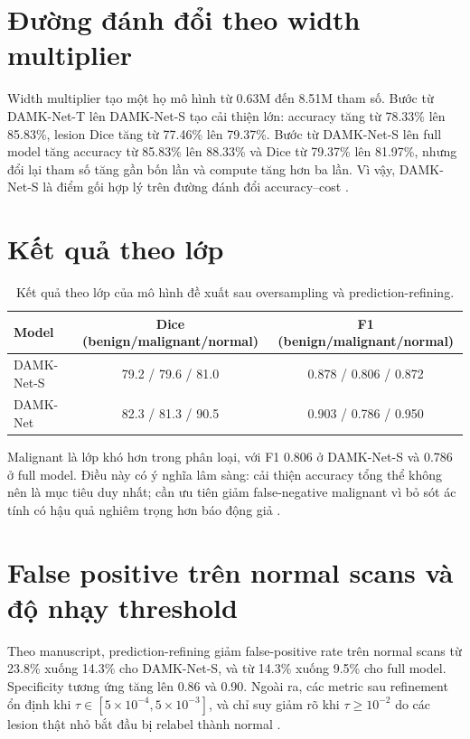 \documentclass[12pt,a4paper,oneside]{report}
\newcommand{\modelname}{DAMK-Net}
\begin{document}
\section{Đường đánh đổi theo width multiplier}

Width multiplier tạo một họ mô hình từ 0.63M đến 8.51M tham số. Bước từ \modelname{}-T lên \modelname{}-S tạo cải thiện lớn: accuracy tăng từ 78.33\% lên 85.83\%, lesion Dice tăng từ 77.46\% lên 79.37\%. Bước từ \modelname{}-S lên full model tăng accuracy từ 85.83\% lên 88.33\% và Dice từ 79.37\% lên 81.97\%, nhưng đổi lại tham số tăng gần bốn lần và compute tăng hơn ba lần. Vì vậy, \modelname{}-S là điểm gối hợp lý trên đường đánh đổi accuracy--cost \citep{damknet}.

\section{Kết quả theo lớp}

\begin{table}[H]
\centering
\caption{Kết quả theo lớp của mô hình đề xuất sau oversampling và prediction-refining.}
\label{tab:per-class}
\begin{tabular}{lcc}
\toprule
\textbf{Model} & \textbf{Dice (benign/malignant/normal)} & \textbf{F1 (benign/malignant/normal)} \\
\midrule
\modelname{}-S & 79.2 / 79.6 / 81.0 & 0.878 / 0.806 / 0.872 \\
\modelname{} & 82.3 / 81.3 / 90.5 & 0.903 / 0.786 / 0.950 \\
\bottomrule
\end{tabular}
\end{table}

Malignant là lớp khó hơn trong phân loại, với F1 0.806 ở \modelname{}-S và 0.786 ở full model. Điều này có ý nghĩa lâm sàng: cải thiện accuracy tổng thể không nên là mục tiêu duy nhất; cần ưu tiên giảm false-negative malignant vì bỏ sót ác tính có hậu quả nghiêm trọng hơn báo động giả \citep{globocan,damknet}.

\section{False positive trên normal scans và độ nhạy threshold}

Theo manuscript, prediction-refining giảm false-positive rate trên normal scans từ 23.8\% xuống 14.3\% cho \modelname{}-S, và từ 14.3\% xuống 9.5\% cho full model. Specificity tương ứng tăng lên 0.86 và 0.90. Ngoài ra, các metric sau refinement ổn định khi $\tau\in[5\times10^{-4},5\times10^{-3}]$, và chỉ suy giảm rõ khi $\tau\geq10^{-2}$ do các lesion thật nhỏ bắt đầu bị relabel thành normal \citep{damknet}.
\end{document}
